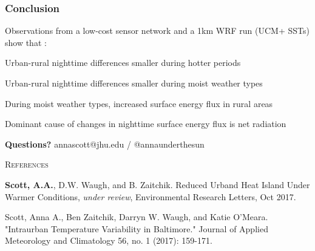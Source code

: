 \documentclass[aspectratio=169, 10pt]{beamer}
\begin{document}
\begin{frame}
\frametitle{Conclusion}
Observations from a low-cost sensor network and a 1km WRF run (UCM+ SSTs) show that : 
\begin{itemize}
\large{
\item Urban-rural nighttime differences smaller during hotter periods
\item Urban-rural nighttime differences smaller during moist weather types
\item During moist weather types, increased surface energy flux in rural areas
\item Dominant cause of changes in nighttime surface energy flux is net radiation 
}
\end{itemize}

\textbf{Questions?} annascott@jhu.edu / @annaunderthesun

\textsc{References}
\small{
\textbf{Scott, A.A.}, D.W. Waugh, and B. Zaitchik. Reduced Urband Heat Island Under Warmer Conditions, \textit{under review}, Environmental Research Letters, Oct 2017. 

Scott, Anna A., Ben Zaitchik, Darryn W. Waugh, and Katie O’Meara. "Intraurban Temperature Variability in Baltimore." Journal of Applied Meteorology and Climatology 56, no. 1 (2017): 159-171.
}
\end{frame}
%
%
%
%
 






\end{document}
